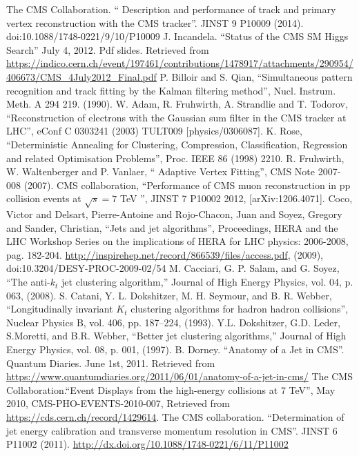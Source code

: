 \documentclass[print]{nuthesis}
\begin{document}
\begin{thebibliography}{300}
 The CMS Collaboration. `` Description and performance of track and primary vertex reconstruction with the CMS tracker''. JINST 9 P10009 (2014). doi:10.1088/1748-0221/9/10/P10009
 J. Incandela. ``Status of the CMS SM Higgs Search'' July 4, 2012. Pdf slides. Retrieved from \url{https://indico.cern.ch/event/197461/contributions/1478917/attachments/290954/406673/CMS_4July2012_Final.pdf}
 P. Billoir and S. Qian, ``Simultaneous pattern recognition and track fitting by the Kalman filtering method'', Nucl. Instrum. Meth. A 294 219. (1990).
 W. Adam, R. Fruhwirth, A. Strandlie and T. Todorov, ``Reconstruction of electrons with the Gaussian sum filter in the CMS tracker at LHC'', eConf C 0303241 (2003) TULT009 [physics/0306087].
 K. Rose,  ``Deterministic Annealing for Clustering, Compression, Classification, Regression and related Optimisation Problems'', Proc. IEEE 86 (1998) 2210.
 R. Fruhwirth, W. Waltenberger and P. Vanlaer, `` Adaptive Vertex Fitting'', CMS Note 2007-008 (2007).
 CMS collaboration, ``Performance of CMS muon reconstruction in pp collision events at $\sqrt{s}= 7$ TeV '', JINST 7 P10002 2012, [arXiv:1206.4071].
 Coco, Victor and Delsart, Pierre-Antoine and Rojo-Chacon, Juan and Soyez, Gregory and Sander, Christian, ``Jets and jet algorithms'', Proceedings, HERA and the LHC Workshop Series on the implications of HERA for LHC physics: 2006-2008, pag. 182-204. \url{http://inspirehep.net/record/866539/files/access.pdf}, (2009), doi:10.3204/DESY-PROC-2009-02/54
 M. Cacciari, G. P. Salam, and G. Soyez, ``The anti-$k_t$ jet clustering algorithm,'' Journal of High Energy Physics, vol. 04, p. 063, (2008).
 S. Catani, Y. L. Dokshitzer, M. H. Seymour, and B. R. Webber, ``Longitudinally invariant $K_t$ clustering algorithms for hadron hadron collisions'', Nuclear Physics B, vol. 406, pp. 187–224, (1993).
 Y.L. Dokshitzer, G.D. Leder, S.Moretti, and B.R. Webber, ``Better jet clustering algorithms,'' Journal of High Energy Physics, vol. 08, p. 001, (1997).
 B. Dorney. ``Anatomy of a Jet in CMS''. Quantum Diaries. June 1st, 2011.  Retrieved from \url{https://www.quantumdiaries.org/2011/06/01/anatomy-of-a-jet-in-cms/}
 The CMS Collaboration.``Event Displays from the high-energy collisions at 7 TeV'', May 2010, CMS-PHO-EVENTS-2010-007, Retrieved from \url{https://cds.cern.ch/record/1429614}.
 The CMS collaboration. ``Determination of jet energy calibration and transverse momentum resolution in CMS''. JINST 6 P11002 (2011). \url{http://dx.doi.org/10.1088/1748-0221/6/11/P11002}

\end{thebibliography}
\end{document}

